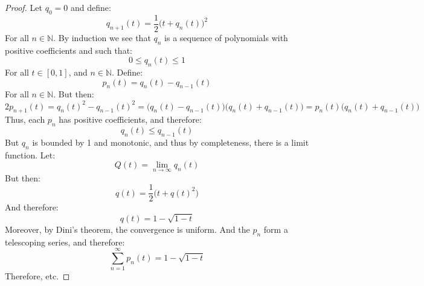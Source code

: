         \begin{proof}
            Let $q_{0}=0$ and define:
            \begin{equation}
                q_{n+1}(t)=\frac{1}{2}\big(t+q_{n}(t)\big)^{2}
            \end{equation}
            For all $n\in\mathbb{N}$. By induction we see that
            $q_{n}$ is a sequence of polynomials with positive
            coefficients and such that:
            \begin{equation}
                0\leq{q}_{n}(t)\leq{1}
            \end{equation}
            For all $t\in[0,1]$, and $n\in\mathbb{N}$. Define:
            \begin{equation}
                p_{n}(t)=q_{n}(t)-q_{n-1}(t)
            \end{equation}
            For all $n\in\mathbb{N}$. But then:
            \begin{equation}
                2p_{n+1}(t)
                =q_{n}(t)^{2}-q_{n-1}(t)^{2}
                =\big(q_{n}(t)-q_{n-1}(t)\big)
                    \big(q_{n}(t)+q_{n-1}(t)\big)
                =p_{n}(t)\big(q_{n}(t)+q_{n-1}(t)\big)
            \end{equation}
            Thus, each $p_{n}$ has positive coefficients, and
            therefore:
            \begin{equation}
                q_{n}(t)\leq{q}_{n-1}(t)
            \end{equation}
            But $q_{n}$ is bounded by 1 and monotonic, and thus
            by completeness, there is a limit function. Let:
            \begin{equation}
                Q(t)=\underset{n\rightarrow\infty}{\lim}q_{n}(t)
            \end{equation}
            But then:
            \begin{equation}
                q(t)=\frac{1}{2}\big(t+q(t)^{2}\big)
            \end{equation}
            And therefore:
            \begin{equation}
                q(t)=1-\sqrt{1-t}
            \end{equation}
            Moreover, by Dini's theorem, the convergence is
            uniform. And the $p_{n}$ form a telescoping series,
            and therefore:
            \begin{equation}
                \sum_{n=1}^{\infty}p_{n}(t)=1-\sqrt{1-t}
            \end{equation}
            Therefore, etc.
        \end{proof}
